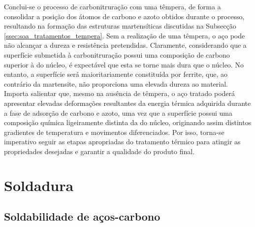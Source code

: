 \newpage
\par
Conclui-se o processo de carbonitruração com uma têmpera, de forma a consolidar a posição dos átomos de carbono e azoto obtidos durante o processo, resultando na formação das estruturas martensíticas discutidas na Subsecção \ref{ssec:soa_tratamentos_tempera}. Sem a realização de uma têmpera, o aço pode não alcançar a dureza e resistência pretendidas. Claramente, considerando que a superfície submetida à carbonitruração possui uma composição de carbono superior à do núcleo, é expectável que esta se torne mais dura que o núcleo. No entanto, a superfície será maioritariamente constituída por ferrite, que, ao contrário da martensite, não proporciona uma elevada dureza ao material. Importa salientar que, mesmo na ausência de têmpera, o aço tratado poderá apresentar elevadas deformações resultantes da energia térmica adquirida durante a fase de adsorção de carbono e azoto, uma vez que a superfície possui uma composição química ligeiramente distinta da do núcleo, originando assim distintos gradientes de temperatura e movimentos diferenciados. Por isso, torna-se imperativo seguir as etapas apropriadas do tratamento térmico para atingir as propriedades desejadas e garantir a qualidade do produto final.
\section{Soldadura}\label{sec:soldadura}
\subsection{Soldabilidade de aços-carbono}\label{ssec:soldadura-soldabilidade}

